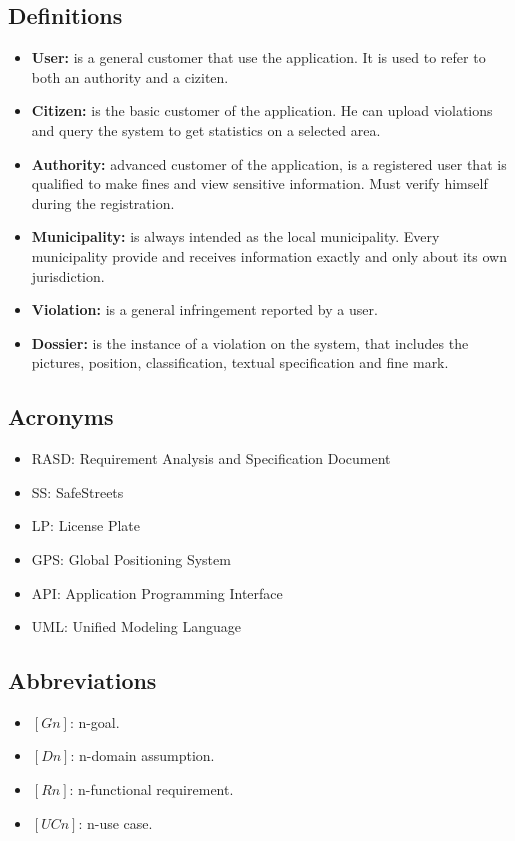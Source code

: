 \documentclass[../RASD.tex]{subfiles}
\begin{document}
        \subsection{Definitions}\label{subsec:definitions}
        \begin{itemize}
            \item \textbf{User:} is a general customer that use the application. It is used to refer to both an authority and a ciziten.
            \item \textbf{Citizen:} is the basic customer of the application. He can upload violations and query the system to get statistics on a selected area.
            \item \textbf{Authority:} advanced customer of the application, is a registered user that is qualified to make fines and view sensitive information. Must verify himself during the registration.
            \item \textbf{Municipality:} is always intended as the local municipality. Every municipality provide and receives information exactly and only about its own jurisdiction.
            \item \textbf{Violation:} is a general infringement reported by a user.
            \item  \textbf{Dossier:} is the instance of a violation on the system, that includes the pictures, position, classification, textual specification and fine mark.
        \end{itemize}

        \subsection{Acronyms}\label{subsec:acronyms}
        \begin{itemize}
            \item RASD: Requirement Analysis and Specification Document
            \item SS: SafeStreets
            \item LP: License Plate
            \item GPS: Global Positioning System
            \item API: Application Programming Interface
            \item UML: Unified Modeling Language
        \end{itemize}

        \subsection{Abbreviations}\label{subsec:abbreviations}
        \begin{itemize}
            \item $[Gn]$: n-goal.
            \item $[Dn]$: n-domain assumption.
            \item $[Rn]$: n-functional requirement.
            \item $[UCn]$: n-use case.
        \end{itemize}
\end{document}
